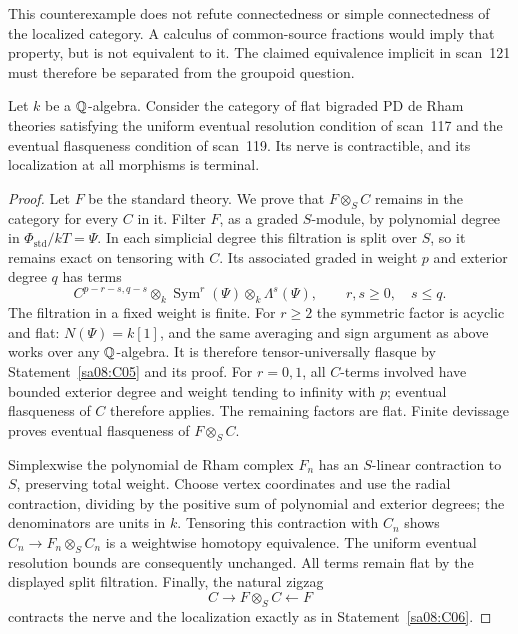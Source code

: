 This counterexample does not refute connectedness or simple
connectedness of the localized category. A calculus of common-source
fractions would imply that property, but is not equivalent to it.
The claimed equivalence implicit in scan~121 must therefore be
separated from the groupoid question.

\begin{theorem}\label{sa08:C08}
Let $k$ be a $\mathbb Q$-algebra. Consider the category of flat bigraded
PD de Rham theories satisfying the uniform eventual resolution
condition of scan~117 and the eventual flasqueness condition of
scan~119. Its nerve is contractible, and its localization at all
morphisms is terminal.
\end{theorem}
\begin{proof}
Let $F$ be the standard theory. We prove that $F\otimes_S C$ remains
in the category for every $C$ in it. Filter $F$, as a graded
$S$-module, by polynomial degree in $\Phi_{\mathrm{std}}/kT=\Psi$.
In each simplicial degree this filtration is split over $S$, so
it remains exact on tensoring with $C$. Its associated graded in
weight $p$ and exterior degree $q$ has terms
\[
 C^{p-r-s,q-s}\otimes_k\operatorname{Sym}^r(\Psi)
 \otimes_k\Lambda^s(\Psi),
 \qquad r,s\ge0,\quad s\le q.
\]
The filtration in a fixed weight is finite. For $r\ge2$ the symmetric
factor is acyclic and flat: $N(\Psi)=k[1]$, and the same averaging and
sign argument as above works over any $\mathbb Q$-algebra. It is therefore
tensor-universally flasque by Statement~\ref{sa08:C05} and its proof.
For $r=0,1$, all $C$-terms involved have bounded exterior degree and
weight tending to infinity with $p$; eventual flasqueness of $C$
therefore applies. The remaining factors are flat. Finite
devissage proves eventual flasqueness of $F\otimes_S C$.

Simplexwise the polynomial de Rham complex $F_n$ has an $S$-linear
contraction to $S$, preserving total weight. Choose vertex
coordinates and use the radial contraction, dividing by the
positive sum of polynomial and exterior degrees; the denominators
are units in $k$. Tensoring this contraction with $C_n$ shows
$C_n\to F_n\otimes_S C_n$ is a weightwise homotopy equivalence.
The uniform eventual resolution bounds are consequently unchanged.
All terms remain flat by the displayed split filtration.
Finally, the natural zigzag
\[
 C\longrightarrow F\otimes_S C\longleftarrow F
\]
contracts the nerve and the localization exactly as in
Statement~\ref{sa08:C06}.
\end{proof}

